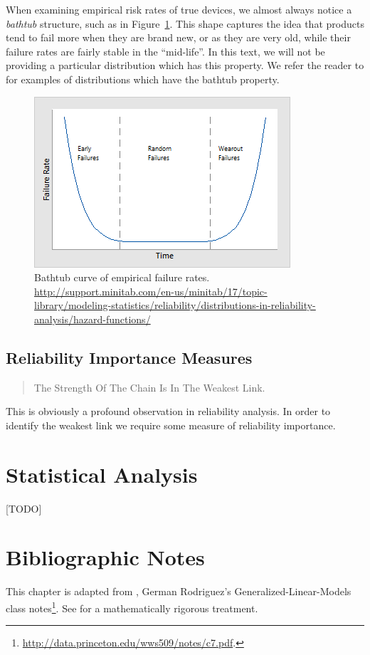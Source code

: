 \begin{example}
When examining empirical risk rates of true devices, we almost always notice a \emph{bathtub} structure, such as in Figure~\ref{fig:bathtub}.
This shape captures the idea that products tend to fail more when they are brand new, or as they are very old, while their failure rates are fairly stable in the ``mid-life''.
In this text, we will not be providing a particular distribution which has this property. 
We refer the reader to \cite{nadarajah_bathtub-shaped_2008} for examples of distributions which have the bathtub property.
\end{example}


\begin{figure}[ht]
\centering
\includegraphics[width=0.5\linewidth]{art/bathtub_curve}
\caption{Bathtub curve of empirical failure rates. \newline
\url{http://support.minitab.com/en-us/minitab/17/topic-library/modeling-statistics/reliability/distributions-in-reliability-analysis/hazard-functions/}}
\label{fig:bathtub}
\end{figure}



\subsection{Reliability Importance Measures}
\begin{quotation}
The Strength Of The Chain Is In The Weakest Link.
\end{quotation}
This is obviously a profound observation in reliability analysis.
In order to identify the weakest link we require some measure of reliability importance.



\section{Statistical Analysis}
[TODO]


\section{Bibliographic Notes}
This chapter is adapted from \cite[Ch.8]{natrella_nist/sematech_2010}, German Rodriguez's Generalized-Linear-Models class notes\footnote{\url{http://data.princeton.edu/wws509/notes/c7.pdf}.}.
See \cite{aven_stochastic_1999} for a mathematically rigorous treatment.

